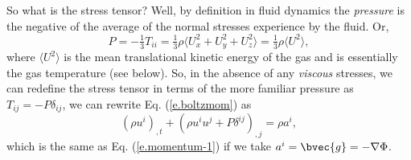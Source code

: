So what is the stress tensor?
Well, by definition in fluid dynamics the {\it pressure} is the negative of the average of the normal stresses experience by the fluid. Or,
\begin{equation}
  P = -\tfrac{1}{3}T_{ii} = \tfrac{1}{3}\rho \langle U^2_x + U^2_y + U^2_z \rangle = \tfrac{1}{3}\rho \langle U^2 \rangle,
\end{equation}
where $\langle U^2 \rangle$ is the mean translational kinetic energy of the gas and is essentially the gas temperature (see below).
So, in the absence of any {\it viscous} stresses, we can redefine the stress tensor in terms of the more familiar pressure as $T_{ij} = -P\delta_{ij}$, we can rewrite Eq. (\ref{e.boltzmom}) as
\begin{equation}
  (\rho u^i)_{,t} + (\rho u^i u^j + P\delta^{ij})_{,j} = \rho a^i,
\end{equation}
which is the same as Eq. (\ref{e.momentum-1}) if we take $a^i = \bvec{g} = -\nabla \Phi$.

